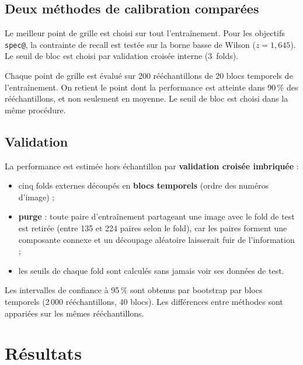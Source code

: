 \documentclass[11pt,a4paper]{article}
\begin{document}
	\subsection{Deux méthodes de calibration comparées}
	\begin{description}[nosep]
		\item[Classique.] Le meilleur point de grille est choisi sur tout l'entraînement. Pour les objectifs \texttt{spec@}, la
		contrainte de recall est testée sur la borne basse de Wilson ($z=1{,}645$). Le seuil de bloc est choisi par
		validation croisée interne (3~folds).
		\item[Robuste.] Chaque point de grille est évalué sur 200 rééchantillons de 20 blocs temporels de l'entraînement.
		On retient le point dont la performance est atteinte dans 90\,\% des rééchantillons, et non seulement en moyenne. Le
		seuil de bloc est choisi dans la même procédure.
	\end{description}
	
	\subsection{Validation}
	La performance est estimée hors échantillon par \textbf{validation croisée imbriquée} :
	\begin{itemize}[nosep]
		\item cinq folds externes découpés en \textbf{blocs temporels} (ordre des numéros d'image) ;
		\item \textbf{purge} : toute paire d'entraînement partageant une image avec le fold de test est retirée
		(entre 135 et 224 paires selon le fold), car les paires forment une composante connexe et un découpage aléatoire
		laisserait fuir de l'information ;
		\item les seuils de chaque fold sont calculés sans jamais voir ses données de test.
	\end{itemize}
	Les intervalles de confiance à 95\,\% sont obtenus par bootstrap par blocs temporels (2\,000 rééchantillons, 40 blocs).
	Les différences entre méthodes sont appariées sur les mêmes rééchantillons.
	
	\section{Résultats}
	
\end{document}
